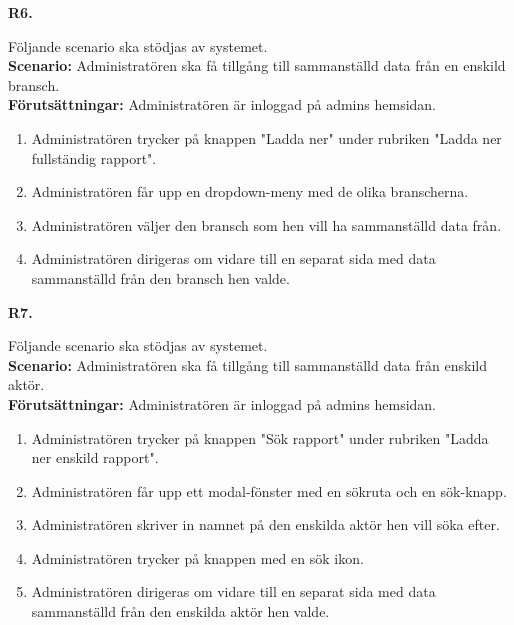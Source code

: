 \documentclass{article}
\begin{document}
\vspace{1em}
\noindent \large{\textbf{R6.}}
    \normalsize{Följande scenario ska stödjas av systemet.
        \\
      \textbf{Scenario:} Administratören ska få tillgång till sammanställd data från en enskild bransch.
        \\
      \textbf{Förutsättningar:} Administratören är inloggad på admins hemsidan.
            \begin{enumerate}
                \item Administratören trycker på knappen "Ladda ner" under rubriken "Ladda ner fullständig rapport".
                \item Administratören får upp en dropdown-meny med de olika branscherna.
                \item Administratören väljer den bransch som hen vill ha sammanställd data från.
                \item  Administratören dirigeras om vidare till en separat sida med data sammanställd från den bransch hen valde.
            \end{enumerate}
            
           } 
           \vspace{1em}
\noindent \large{\textbf{R7.}}
    \normalsize{Följande scenario ska stödjas av systemet.
        \\
       \textbf{Scenario:} Administratören ska få tillgång till sammanställd data från enskild aktör.
        \\
       \textbf{Förutsättningar:} Administratören är inloggad på admins hemsidan.
            \begin{enumerate}
                \item Administratören trycker på knappen "Sök rapport" under rubriken "Ladda ner enskild rapport".
                \item Administratören får upp ett modal-fönster med en sökruta och en sök-knapp.
                \item Administratören skriver in namnet på den enskilda aktör hen vill söka efter.
                \item Administratören trycker på knappen med en sök ikon.
                \item  Administratören dirigeras om vidare till en separat sida med data sammanställd från den enskilda aktör hen valde.
            \end{enumerate}
    }
    
    \vspace{1em}
\end{document}
